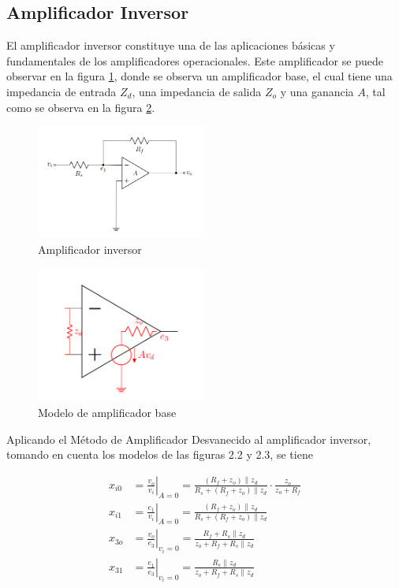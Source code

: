 \subsection{Amplificador Inversor}

El amplificador inversor constituye una de las aplicaciones básicas y fundamentales de los amplificadores operacionales. Este amplificador se puede observar en la figura \ref{fig:mt-amplificador-inversor}, donde se observa un amplificador base, el cual tiene
una impedancia de entrada $Z_d$, una impedancia de salida $Z_o$ y una ganancia $A$, tal como se observa en la figura \ref{fig:mt-modelo-amp-base}.

\begin{figure}[ht]
    \centering
    \includegraphics[width=0.5\textwidth]{src/images/amplificador-inversor.png}
    \caption{Amplificador inversor}
    \label{fig:mt-amplificador-inversor}
\end{figure}

\begin{figure}[ht]
    \centering
    \includegraphics[width=0.5\textwidth]{src/images/modelo-amp-base.png}
    \caption{Modelo de amplificador base}
    \label{fig:mt-modelo-amp-base}
\end{figure}


Aplicando el Método de Amplificador Desvanecido al amplificador inversor, tomando en cuenta los modelos de las figuras 2.2 y 2.3, se tiene

\begin{align*}
    x_{i0} &= \left. \frac{v_o}{v_i} \right|_{A=0} = \frac{(R_f + z_o) \parallel z_d}{R_s + (R_f + z_o) \parallel z_d} \cdot \frac{z_o}{z_o + R_f} \\
    x_{i1} &= \left. \frac{e_1}{v_i} \right|_{A=0} = \frac{(R_f + z_o) \parallel z_d}{R_s + (R_f + z_o) \parallel z_d} \\
    x_{3o} &= \left. \frac{v_o}{e_3} \right|_{v_i=0} = \frac{R_f + R_s \parallel z_d}{z_o + R_f + R_s \parallel z_d} \\
    x_{31} &= \left. \frac{e_1}{e_3} \right|_{v_i=0} = \frac{R_s \parallel z_d}{z_o + R_f + R_s \parallel z_d}
\end{align*}

